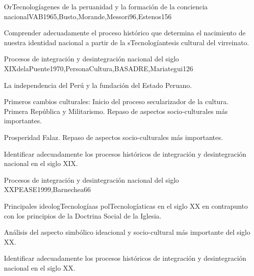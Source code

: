 \begin{syllabus}
\begin{unit}{OrTecnologíagenes de la peruanidad y la formación de la conciencia nacional}{VAB1965,Busto,Morande,Messori96,Estenos}{15}{6}
\begin{topics}
\end{topics}
\begin{learningoutcomes}
	\item Comprender adecuadamente el proceso histórico que determina el nacimiento de nuestra identidad nacional a partir de la sTecnologíantesis cultural del virreinato.
\end{learningoutcomes}
\end{unit}

\begin{unit}{Procesos de integración y desintegración nacional del siglo XIX}{delaPuente1970,PersonaCultura,BASADRE,Mariategui}{12}{6}
\begin{topics}
	\item La independencia del Perú y la fundación del Estado Peruano.
	\item Primeros cambios culturales: Inicio del proceso secularizador de la cultura. Primera República y Militarismo. Repaso de  aspectos socio-culturales más importantes.
	\item Prosperidad Falaz.  Repaso de  aspectos socio-culturales más importantes. 
\end{topics}
\begin{learningoutcomes}
	\item Identificar adecuadamente los procesos históricos de integración y desintegración nacional en el siglo XIX.
\end{learningoutcomes}
\end{unit}

\begin{unit}{Procesos de integración y desintegración nacional del siglo XX}{PEASE1999,Barnechea}{6}{6}
\begin{topics}
	\item Principales ideologTecnologíaas polTecnologíaticas en el siglo XX en contrapunto con los principios de la Doctrina Social de la Iglesia.
	\item Análisis del aspecto simbólico ideacional y socio-cultural más importante del siglo XX. 

\end{topics}
\begin{learningoutcomes}
	\item Identificar adecuadamente los procesos históricos de integración y desintegración nacional en el siglo XX. 
\end{learningoutcomes}
\end{unit}


\end{syllabus}
